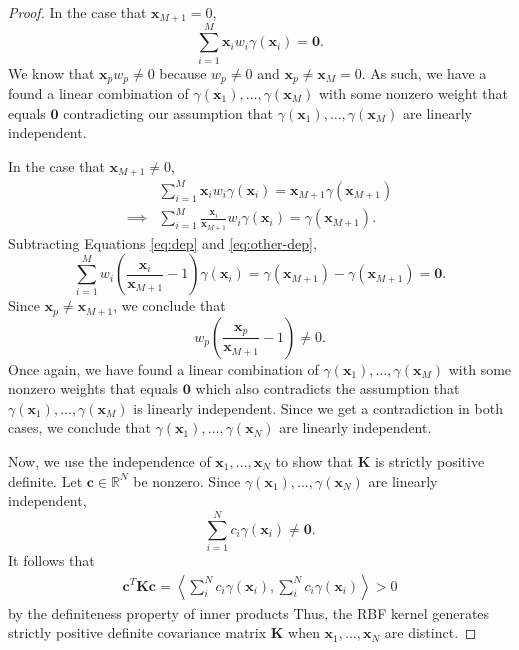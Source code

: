 \begin{proof}
    In the case that $\mathbf{x}_{M + 1} = 0$,
    \begin{equation*}
        \sum\limits_{i=1}^{M} \mathbf{x}_i w_i \gamma(\mathbf{x}_i) = \mathbf{0}.
    \end{equation*}
    We know that $\mathbf{x}_p w_p \neq 0$ because $w_p \neq 0$ and $\mathbf{x}_p \neq \mathbf{x}_M = 0$.
    As such, we have a found a linear combination of $\gamma(\mathbf{x}_1), \dots, \gamma(\mathbf{x}_M)$ with some nonzero weight that equals $\mathbf{0}$ contradicting our assumption that $\gamma(\mathbf{x}_1), \dots, \gamma(\mathbf{x}_M)$ are linearly independent.

    In the case that $\mathbf{x}_{M + 1} \neq 0$,
    \begin{align}
        &\sum\limits_{i=1}^{M} \mathbf{x}_i w_i \gamma(\mathbf{x}_i) = {\mathbf{x}_{M + 1}}\gamma(\mathbf{x}_{M + 1}) \\
        \implies &\sum\limits_{i=1}^{M} \frac{\mathbf{x}_i}{\mathbf{x}_{M + 1}} w_i \gamma(\mathbf{x}_i) = \gamma(\mathbf{x}_{M + 1}). \label{eq:other-dep}
    \end{align}
    Subtracting Equations \ref{eq:dep} and \ref{eq:other-dep},
    \begin{equation*}
        \sum\limits_{i=1}^{M} w_i \left(\frac{\mathbf{x}_i}{\mathbf{x}_{M + 1}} - 1\right) \gamma(\mathbf{x}_i) = \gamma(\mathbf{x}_{M + 1}) - \gamma(\mathbf{x}_{M + 1}) = \mathbf{0}.
    \end{equation*}
    Since $\mathbf{x}_p \neq \mathbf{x}_{M + 1}$, we conclude that
    \begin{equation*}
        w_p\left(\frac{ \mathbf{x}_p }{ \mathbf{x}_{M + 1} } - 1\right) \neq 0.
    \end{equation*}
    Once again, we have found a linear combination of $\gamma(\mathbf{x}_1), \dots, \gamma(\mathbf{x}_M)$ with some nonzero weights that equals $\mathbf{0}$ which also contradicts the assumption that $\gamma(\mathbf{x}_1), \dots, \gamma(\mathbf{x}_M)$ is linearly independent.
    Since we get a contradiction in both cases, we conclude that $\gamma(\mathbf{x}_1), \dots, \gamma(\mathbf{x}_N)$ are linearly independent.

    Now, we use the independence of $\mathbf{x}_1, \dots, \mathbf{x}_N$ to show that $\mathbf{K}$ is strictly positive definite.
    Let $\mathbf{c} \in \mathbb{R}^{N}$ be nonzero.
    Since $\gamma(\mathbf{x}_1), \dots, \gamma(\mathbf{x}_N)$ are linearly independent,
    \begin{equation*}
        \sum\limits_{i = 1}^{N} c_i \gamma(\mathbf{x}_i) \neq \mathbf{0}.
    \end{equation*}
    It follows that
    \begin{align*}
        \mathbf{c}^{T} \mathbf{K} \mathbf{c}
        = \left\langle \sum\limits_{i}^{N} c_i \gamma(\mathbf{x}_i), \sum\limits_{i}^{N} c_i \gamma(\mathbf{x}_i) \right\rangle
        > 0
    \end{align*}
    by the definiteness property of inner products
    Thus, the RBF kernel generates strictly positive definite covariance matrix $\mathbf{K}$ when $\mathbf{x}_1, \dots, \mathbf{x}_N$
    are distinct.
\end{proof}
